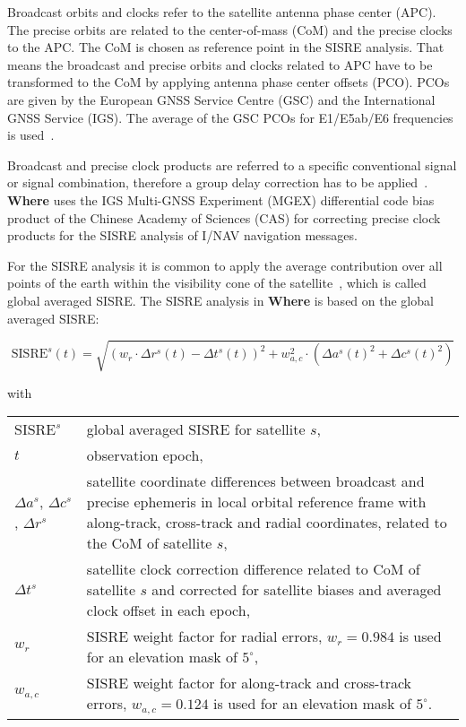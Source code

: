 Broadcast orbits and clocks refer to the satellite antenna phase center (APC). The precise orbits are related to the center-of-mass (CoM) and the precise clocks to the APC. The CoM is chosen as reference point in the SISRE analysis. That means the broadcast and precise orbits and clocks related to APC have to be transformed to the CoM by applying antenna phase center offsets (PCO). PCOs are given by the European GNSS Service Centre (GSC) and the International GNSS Service (IGS). The average of the GSC PCOs for E1/E5ab/E6 frequencies is used~\cite{montenbruck2018}.

Broadcast and precise clock products are referred to a specific conventional signal or signal combination, therefore a group delay correction has to be applied~\cite{montenbruck2018}. \textbf{Where} uses the IGS Multi-GNSS Experiment (MGEX) differential code bias product of the Chinese Academy of Sciences (CAS) for correcting precise clock products for the SISRE analysis of I/NAV navigation messages. 

For the SISRE analysis it is common to apply the average contribution over all points of the earth within the visibility cone of the satellite~\cite{montenbruck2015b}, which is called global averaged SISRE. The SISRE analysis in \textbf{Where} is based on the global averaged SISRE:

\begin{equation*}   
     \text{SISRE}^s(t) = \sqrt{(w_r \cdot \Delta r^s(t) - \Delta t^s(t))^2 + w_{a,c}^2 \cdot (\Delta {a^s}(t)^2 + \Delta {c^s}(t)^2)}
  \label{eq:sisre}  
\end{equation*}

with

\begin{center}
\begin{tabularx}{.9\columnwidth}{lX}
$\text{SISRE}^s$       & global averaged SISRE for satellite $s$, \\
$t$  & observation epoch, \\
$\Delta a^s$, $\Delta c^s$, $\Delta r^s$   & satellite coordinate differences between broadcast and precise ephemeris in local orbital reference frame with along-track, cross-track and radial coordinates, related to the CoM of satellite $s$,\\
$\Delta t^s$ & satellite clock correction difference related to CoM of satellite $s$ and corrected for satellite biases and averaged clock offset in each epoch,\\
$w_r$        & SISRE weight factor for radial errors, $w_r = 0.984$ is used for an elevation mask of $5^{\circ}$,\\
$w_{a,c}$    & SISRE weight factor for along-track and cross-track errors, $w_{a,c} = 0.124$ is used for an elevation mask of $5^{\circ}$.\\
\end{tabularx}
\end{center}


